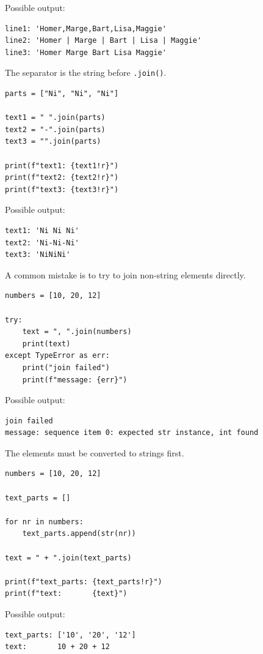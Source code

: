 Possible output:

\begin{verbatim}
line1: 'Homer,Marge,Bart,Lisa,Maggie'
line2: 'Homer | Marge | Bart | Lisa | Maggie'
line3: 'Homer Marge Bart Lisa Maggie'
\end{verbatim}

The separator is the string before \texttt{.join()}.

\begin{verbatim}
parts = ["Ni", "Ni", "Ni"]

text1 = " ".join(parts)
text2 = "-".join(parts)
text3 = "".join(parts)

print(f"text1: {text1!r}")
print(f"text2: {text2!r}")
print(f"text3: {text3!r}")
\end{verbatim}

Possible output:

\begin{verbatim}
text1: 'Ni Ni Ni'
text2: 'Ni-Ni-Ni'
text3: 'NiNiNi'
\end{verbatim}

A common mistake is to try to join non-string elements directly.

\begin{verbatim}
numbers = [10, 20, 12]

try:
    text = ", ".join(numbers)
    print(text)
except TypeError as err:
    print("join failed")
    print(f"message: {err}")
\end{verbatim}

Possible output:

\begin{verbatim}
join failed
message: sequence item 0: expected str instance, int found
\end{verbatim}

The elements must be converted to strings first.

\begin{verbatim}
numbers = [10, 20, 12]

text_parts = []

for nr in numbers:
    text_parts.append(str(nr))

text = " + ".join(text_parts)

print(f"text_parts: {text_parts!r}")
print(f"text:       {text}")
\end{verbatim}

Possible output:

\begin{verbatim}
text_parts: ['10', '20', '12']
text:       10 + 20 + 12
\end{verbatim}


